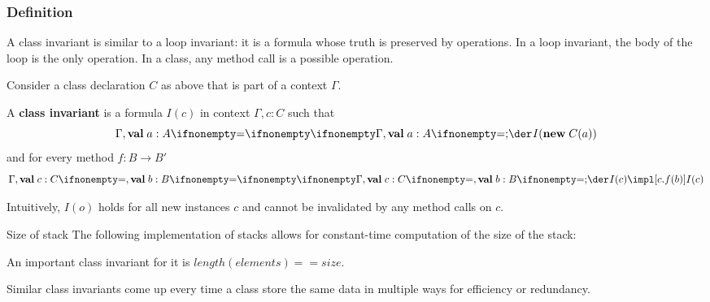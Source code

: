 \subsubsection{Definition}

A class invariant is similar to a loop invariant: it is a formula whose truth is preserved by operations.
In a loop invariant, the body of the loop is the only operation.
In a class, any method call is a possible operation.

\begin{definition}
Consider a class declaration $C$ as above that is part of a context $\Gamma$.

A \textbf{class invariant} is a formula $I(c)$ in context $\Gamma,c:C$ such that
\[\iscons{}{\Gamma,\aval{a}{A}{}}{}{I(\anew{C}{a})}\]
and for every method $f:B\to B'$
\[\iscons{}{\Gamma,\aval{c}{C}{},\aval{b}{B}{}}{}{I(c)\impl \abox{c.f(b)}{I(c)}}\]
\end{definition}

Intuitively, $I(o)$ holds for all new instances $c$ and cannot be invalidated by any method calls on $c$.

\begin{example}{Size of stack}
The following implementation of stacks allows for constant-time computation of the size of the stack:
\begin{acode}
\end{acode}

An important class invariant for it is $length(elements)==size$.
\end{example}

Similar class invariants come up every time a class store the same data in multiple ways for efficiency or redundancy.

